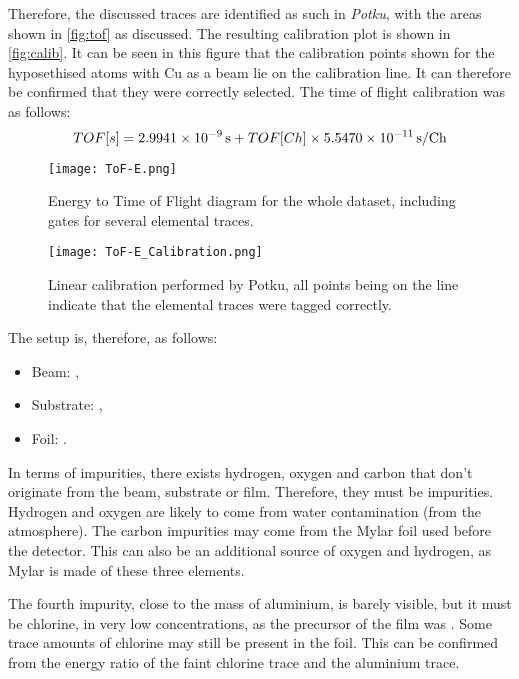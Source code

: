 Therefore, the discussed traces are identified as such in \textit{Potku}, with the areas shown in \autoref{fig:tof} as discussed. The resulting calibration plot is shown in \autoref{fig:calib}. It can be seen in this figure that the calibration points shown for the hyposethised atoms with Cu as a beam lie on the calibration line. It can therefore be confirmed that they were correctly selected. The time of flight calibration was as follows:
\begin{equation}
    \label{eq:tofcal}
    TOF[s] = 2.9941\times 10^{-9}\,\text{s} + TOF[Ch]\times5.5470\times 10^{-11}\,\text{s/Ch}
\end{equation}
\newpage

\begin{figure}[h!]
    \centering
    \texttt{[image: ToF-E.png]}
    \caption{Energy to Time of Flight diagram for the whole dataset, including gates for several elemental traces.}
    \label{fig:tof}
\end{figure}

\begin{figure}[h!]
    \centering
    \texttt{[image: ToF-E\_Calibration.png]}
    \caption{Linear calibration performed by Potku, all points being on the line indicate that the elemental traces were tagged correctly.}
    \label{fig:calib}
\end{figure}
\newpage


The setup is, therefore, as follows: \begin{itemize}
    \item Beam: ,
    \item Substrate: ,
    \item Foil: . 
\end{itemize}
In terms of impurities, there exists hydrogen, oxygen and carbon that don't originate from the beam, substrate or film. Therefore, they must be impurities. Hydrogen and oxygen are likely to come from water contamination (from the atmosphere). The carbon impurities may come from the Mylar foil used before the detector. This can also be an additional source of oxygen and hydrogen, as Mylar is made of these three elements.

The fourth impurity, close to the mass of aluminium, is barely visible, but it must be chlorine, in very low concentrations, as the precursor of the film was . Some trace amounts of chlorine may still be present in the foil. This can be confirmed from the energy ratio of the faint chlorine trace and the aluminium trace.

